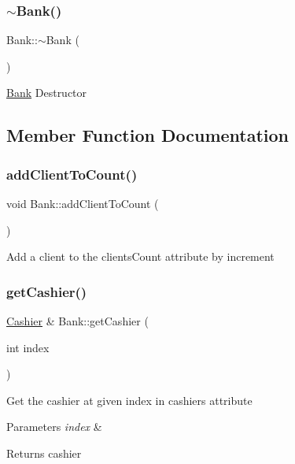 \subsubsection{\texorpdfstring{$\sim$\+Bank()}{~Bank()}}
{\footnotesize\ttfamily Bank\+::$\sim$\+Bank (\begin{DoxyParamCaption}{ }\end{DoxyParamCaption})}

\hyperlink{classBank}{Bank} Destructor 

\subsection{Member Function Documentation}
\mbox{\label{classBank_a2fe9f47aabc4fe73adc07af460f30dcc}} 
\subsubsection{\texorpdfstring{add\+Client\+To\+Count()}{addClientToCount()}}
{\footnotesize\ttfamily void Bank\+::add\+Client\+To\+Count (\begin{DoxyParamCaption}{ }\end{DoxyParamCaption})}

Add a client to the clients\+Count attribute by increment \mbox{\label{classBank_a7eb0b71ef408a8e9798eb1d28e1733ea}} 
\subsubsection{\texorpdfstring{get\+Cashier()}{getCashier()}}
{\footnotesize\ttfamily \hyperlink{classCashier}{Cashier} \& Bank\+::get\+Cashier (\begin{DoxyParamCaption}\item[{int}]{index }\end{DoxyParamCaption})}

Get the cashier at given index in cashiers attribute 
\begin{DoxyParams}{Parameters}
{\em index} & \\
\hline
\end{DoxyParams}
\begin{DoxyReturn}{Returns}
cashier 
\end{DoxyReturn}
\mbox{\label{classBank_a46e579a690e0d3ca175923fcbae30a2d}} 
